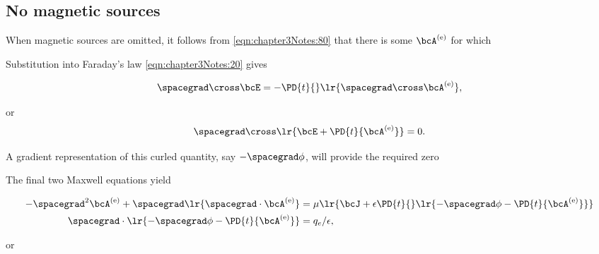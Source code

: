 %
%

\subsection{No magnetic sources}

When magnetic sources are omitted, it follows from \cref{eqn:chapter3Notes:80} that there is some \( \bcA^\e \) for which


Substitution into Faraday's law \cref{eqn:chapter3Notes:20} gives

\begin{dmath}\label{eqn:potentialMethods:40}
\spacegrad \cross \bcE = - \PD{t}{}\lr{ \spacegrad \cross \bcA^\e },
\end{dmath}

or
\begin{dmath}\label{eqn:potentialMethods:60}
\spacegrad \cross \lr{ \bcE + \PD{t}{ \bcA^\e } } = 0.
\end{dmath}

A gradient representation of this curled quantity, say \( -\spacegrad \phi \), will provide the required zero


The final two Maxwell equations yield

\begin{dmath}\label{eqn:potentialMethods:100}
\begin{aligned}
-\spacegrad^2 \bcA^\e + \spacegrad \lr{ \spacegrad \cdot \bcA^\e } &= \mu \lr{ \bcJ + \epsilon \PD{t}{} \lr{ -\spacegrad \phi -\PD{t}{ \bcA^\e } } } \\
\spacegrad \cdot \lr{ -\spacegrad \phi -\PD{t}{ \bcA^\e } } &= q_e/\epsilon,
\end{aligned}
\end{dmath}

or

